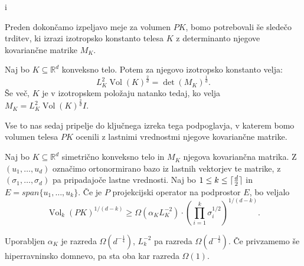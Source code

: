i\documentclass[mat1]{fmfdelo}
\DeclarePairedDelimiter\ceil{\lceil}{\rceil}
\newcommand{\R}{\mathbb R}
\DeclareMathOperator{\Vol}{Vol}
\begin{document}
Preden dokončamo izpeljavo meje za volumen $PK$, bomo potrebovali še sledečo trditev, ki izrazi izotropsko konstanto telesa $K$ z determinanto njegove kovariančne matrike $M_K$.

\begin{trditev} \label{isotropfix}
    Naj bo $K \subseteq \R^d$ konveksno telo. Potem za njegovo izotropsko konstanto velja:
    \begin{equation*}
        L_K^2 \Vol(K)^\frac{2}{d} = \det(M_K)^\frac{1}{d}.
    \end{equation*}
    Še več, $K$ je v izotropskem položaju natanko tedaj, ko velja $M_K=L_K^2 \Vol(K)^\frac{2}{d} I$.
\end{trditev}

Vse to nas sedaj pripelje do ključnega izreka tega podpoglavja, v katerem bomo volumen telesa $PK$ ocenili z lastnimi vrednostmi njegove kovariančne matrike.
\begin{izrek} \label{prodeigen}
    Naj bo $K \subseteq \R^d$ simetrično konveksno telo in $M_K$ njegova kovariančna matrika. Z $(u_1,\dots,u_d)$ označimo ortonormirano bazo iz lastnih vektorjev te matrike, z $(\sigma_1,\dots,\sigma_d)$ pa pripadajoče lastne vrednosti. Naj bo $1 \leq k \leq \ceil{\frac{d}{2}}$ in $E=span\{u_1,\dots,u_k\}$. Če je $P$ projekcijski operator na podprostor $E$, bo veljalo
    \begin{equation*}
        \Vol_k(PK)^{1/(d-k)} \geq \Omega(\alpha_K L_K^{-2}) \cdot \left(\prod_{i=1}^k \sigma_i^{1/2}\right)^{1/(d-k)}.
    \end{equation*}
    
    Uporabljen $\alpha_K$ je razreda $\Omega(d^{-\frac{1}{4}})$, $L_k^{-2}$ pa razreda $\Omega(d^{-\frac{1}{2}})$. Če privzamemo še hiperravninsko domnevo, pa sta oba kar razreda $\Omega(1)$.
\end{izrek}
\end{document}
